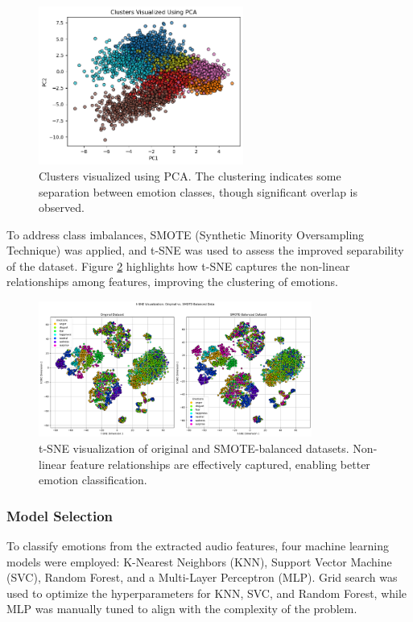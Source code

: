 \documentclass{article}
\begin{document}
\begin{figure}[!h]
    \centering
    \includegraphics[width=0.6\textwidth]{../assets/pca_visualization.png}
    \caption{Clusters visualized using PCA. The clustering indicates some separation between emotion classes, 
    though significant overlap is observed.}
    \label{fig:pca_visualization}
\end{figure}

To address class imbalances, SMOTE (Synthetic Minority Oversampling Technique) was applied, and t-SNE was used to 
assess the improved separability of the dataset. Figure \ref{fig:tsne_visualization} highlights how t-SNE captures 
the non-linear relationships among features, improving the clustering of emotions.

\begin{figure}[!h]
    \centering
    \includegraphics[width=0.8\textwidth]{../assets/tsne_visualization.png}
    \caption{t-SNE visualization of original and SMOTE-balanced datasets. Non-linear feature relationships are 
    effectively captured, enabling better emotion classification.}
    \label{fig:tsne_visualization}
\end{figure}


\subsubsection*{Model Selection}
To classify emotions from the extracted audio features, four machine learning models were employed: K-Nearest Neighbors 
(KNN), Support Vector Machine (SVC), Random Forest, and a Multi-Layer Perceptron (MLP). Grid search was used to optimize 
the hyperparameters for KNN, SVC, and Random Forest, while MLP was manually tuned to align with the complexity of the problem.
\end{document}
